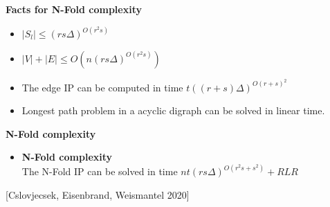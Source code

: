 \textbf{Facts for N-Fold complexity}
\begin{itemize}
    \item $|S_l| \leq (rs\Delta)^{O(r^2s)}$
    \item $|V| + |E| \leq O(n(rs\Delta)^{O(r^2s)})$
    \item The edge IP can be computed in time $t((r + s)\Delta)^{O(r + s)^2}$
    \item Longest path problem in a acyclic digraph can be solved in linear time.
\end{itemize}

\textbf{N-Fold complexity}
\begin{itemize}
\item \textbf{N-Fold complexity}\\
    The N-Fold IP can be solved in time $nt(rs\Delta)^{O(r^2s + s^2)} + RLR$
\end{itemize}
\hspace{15pt}[Cslovjecsek, Eisenbrand, Weismantel 2020]